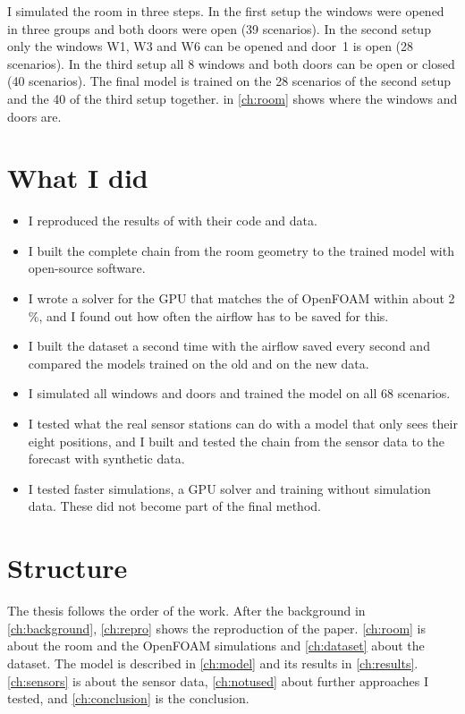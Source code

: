 I simulated the room in three steps. In the first setup the windows were opened in three groups and both
doors were open (39 scenarios). In the second setup only the windows W1, W3 and W6 can be opened and door~1 is
open (28 scenarios). In the third setup all 8 windows and both doors can be open or closed (40 scenarios).
The final model is trained on the 28 scenarios of the second setup and the 40 of the third setup together.
 in \cref{ch:room} shows where the windows and doors are.

\section{What I did}
\begin{itemize}
  \item I reproduced the results of \citet{bian2025} with their code and data.
  \item I built the complete chain from the room geometry to the trained model with open-source software.
  \item I wrote a \cotwo{} solver for the GPU that matches the \cotwo{} of OpenFOAM within about 2\,\%, and I
        found out how often the airflow has to be saved for this.
  \item I built the dataset a second time with the airflow saved every second and compared the models trained on the old and
        on the new data.
  \item I simulated all windows and doors and trained the model on all 68 scenarios.
  \item I tested what the real sensor stations can do with a model that only sees their eight positions, and
        I built and tested the chain from the sensor data to the forecast with synthetic data.
  \item I tested faster simulations, a GPU solver and training without simulation data. These did not become
        part of the final method.
\end{itemize}

\section{Structure}
The thesis follows the order of the work. After the background in \cref{ch:background}, \cref{ch:repro}
shows the reproduction of the paper. \cref{ch:room} is about the room and the OpenFOAM simulations and
\cref{ch:dataset} about the \cotwo{} dataset. The model is described in \cref{ch:model} and its results in
\cref{ch:results}. \cref{ch:sensors} is about the sensor data, \cref{ch:notused} about further approaches I
tested, and \cref{ch:conclusion} is the conclusion.
